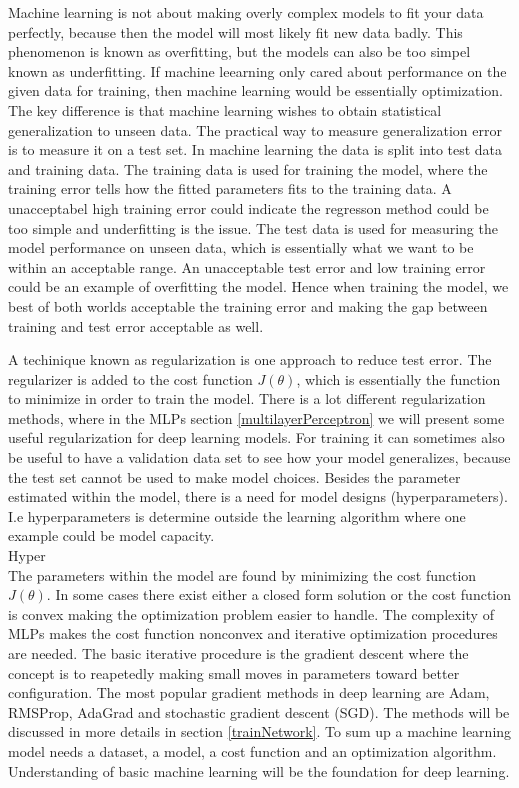 Machine learning is not about making overly complex models to fit your data perfectly, because then the model will most likely fit new data badly. This phenomenon is known as overfitting, but the models can also be too simpel known as underfitting. If machine leearning only cared about performance on the given data for training, then machine learning would be essentially optimization. The key difference is that machine learning wishes to obtain statistical generalization to unseen data. The practical way to measure generalization error is to measure it on a test set. In machine learning the data is split into test data and training data. The training data is used for training the model, where the training error tells how the fitted parameters fits to the training data. A unacceptabel high training error could indicate the regresson method could be too simple and underfitting is the issue. The test data is used for measuring the model performance on unseen data, which is essentially what we want to be within an acceptable range. An unacceptable test error and low training error could be an example of overfitting the model. Hence when training the model, we best of both worlds acceptable the training error and making the gap between training and test error acceptable as well. 

A techinique known as regularization is one approach to reduce test error. The regularizer is added to the cost function $J(\theta)$, which is essentially the function to minimize in order to train the model. There is a lot different regularization methods, where in the MLPs section \ref{multilayerPerceptron} we will present some useful regularization for deep learning models. For training it can sometimes also be useful to have a validation data set to see how your model generalizes, because the test set cannot be used to make model choices. Besides the parameter estimated within the model, there is a need for model designs (hyperparameters). I.e hyperparameters is determine outside the learning algorithm where one example could be model capacity.\\

Hyper\\

The parameters within the model are found by minimizing the cost function $J(\theta)$. In some cases there exist either a closed form solution or the cost function is convex making the optimization problem easier to handle. The complexity of MLPs makes the cost function nonconvex and iterative optimization procedures are needed. The basic iterative procedure is the gradient descent where the concept is to reapetedly making small moves in parameters toward better configuration. The most popular gradient methods in deep learning are Adam, RMSProp, AdaGrad and stochastic gradient descent (SGD). The methods will be discussed in more details in section \ref{trainNetwork}. To sum up a machine learning model needs a dataset, a model, a cost function and an optimization algorithm. Understanding of basic machine learning will be the foundation for deep learning.\\



